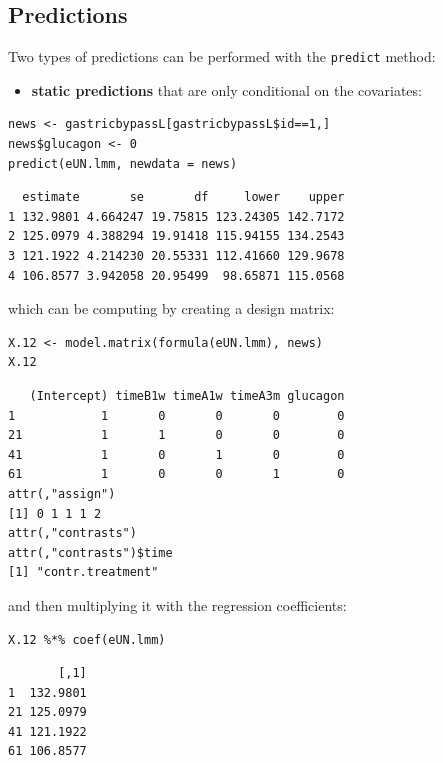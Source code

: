 \documentclass[12pt]{article}
\begin{document}
\subsection{Predictions}
\label{sec:orga11ece2}

Two types of predictions can be performed with the \texttt{predict} method:
\begin{itemize}
\item \textbf{static predictions} that are only conditional on the covariates:
\end{itemize}
\lstset{language=r,label= ,caption= ,captionpos=b,numbers=none}
\begin{lstlisting}
news <- gastricbypassL[gastricbypassL$id==1,]
news$glucagon <- 0
predict(eUN.lmm, newdata = news)
\end{lstlisting}

\begin{verbatim}
  estimate       se       df     lower    upper
1 132.9801 4.664247 19.75815 123.24305 142.7172
2 125.0979 4.388294 19.91418 115.94155 134.2543
3 121.1922 4.214230 20.55331 112.41660 129.9678
4 106.8577 3.942058 20.95499  98.65871 115.0568
\end{verbatim}


\clearpage

which can be computing by creating a design matrix:
\lstset{language=r,label= ,caption= ,captionpos=b,numbers=none}
\begin{lstlisting}
X.12 <- model.matrix(formula(eUN.lmm), news)
X.12
\end{lstlisting}

\begin{verbatim}
   (Intercept) timeB1w timeA1w timeA3m glucagon
1            1       0       0       0        0
21           1       1       0       0        0
41           1       0       1       0        0
61           1       0       0       1        0
attr(,"assign")
[1] 0 1 1 1 2
attr(,"contrasts")
attr(,"contrasts")$time
[1] "contr.treatment"
\end{verbatim}

and then multiplying it with the regression coefficients:
\lstset{language=r,label= ,caption= ,captionpos=b,numbers=none}
\begin{lstlisting}
X.12 %*% coef(eUN.lmm)
\end{lstlisting}

\begin{verbatim}
       [,1]
1  132.9801
21 125.0979
41 121.1922
61 106.8577
\end{verbatim}
\end{document}
